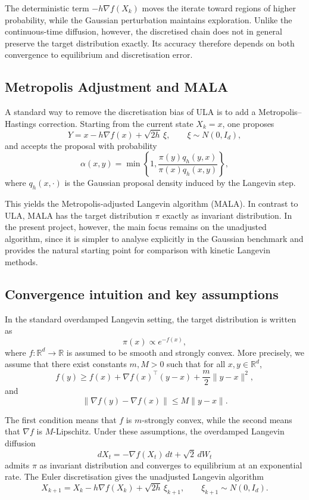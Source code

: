 \documentclass[a4paper,11pt, titlepage]{article}
\theoremstyle{definition}
\theoremstyle{plain}
\theoremstyle{remark}
\begin{document}
The deterministic term $-h\nabla f(X_k)$ moves the iterate toward regions of higher probability, while the Gaussian perturbation maintains exploration. Unlike the continuous-time diffusion, however, the discretised chain does not in general preserve the target distribution exactly. Its accuracy therefore depends on both convergence to equilibrium and discretisation error.

\subsection{Metropolis Adjustment and MALA}

A standard way to remove the discretisation bias of ULA is to add a Metropolis--Hastings correction. Starting from the current state $X_k=x$, one proposes
\[
Y=x-h\nabla f(x)+\sqrt{2h}\,\xi,
\qquad
\xi\sim N(0,I_d),
\]
and accepts the proposal with probability
\[
\alpha(x,y)=\min\left\{1,\frac{\pi(y)q_h(y,x)}{\pi(x)q_h(x,y)}\right\},
\]
where $q_h(x,\cdot)$ is the Gaussian proposal density induced by the Langevin step.

This yields the Metropolis-adjusted Langevin algorithm (MALA). In contrast to ULA, MALA has the target distribution $\pi$ exactly as invariant distribution. In the present project, however, the main focus remains on the unadjusted algorithm, since it is simpler to analyse explicitly in the Gaussian benchmark and provides the natural starting point for comparison with kinetic Langevin methods.

\subsection{Convergence intuition and key assumptions}

In the standard overdamped Langevin setting, the target distribution is written as
\[
\pi(x)\propto e^{-f(x)},
\]
where $f:\mathbb{R}^d\to\mathbb{R}$ is assumed to be smooth and strongly convex. More precisely, we assume that there exist constants $m,M>0$ such that for all $x,y\in\mathbb{R}^d$,
\[
f(y)\geq f(x)+\nabla f(x)^\top (y-x)+\frac{m}{2}\|y-x\|^2,
\]
and
\[
\|\nabla f(y)-\nabla f(x)\|\leq M\|y-x\|.
\]

The first condition means that $f$ is $m$-strongly convex, while the second means that $\nabla f$ is $M$-Lipschitz. Under these assumptions, the overdamped Langevin diffusion
\[
dX_t=-\nabla f(X_t)\,dt+\sqrt{2}\,dW_t
\]
admits $\pi$ as invariant distribution and converges to equilibrium at an exponential rate. The Euler discretisation gives the unadjusted Langevin algorithm
\[
X_{k+1}=X_k-h\nabla f(X_k)+\sqrt{2h}\,\xi_{k+1},
\qquad
\xi_{k+1}\sim N(0,I_d).
\]
\end{document}
